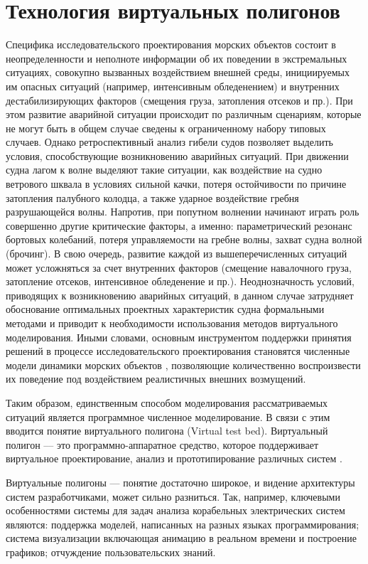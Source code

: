 \section{Технология виртуальных полигонов}
\label{ch1_1_1}

Специфика исследовательского проектирования морских объектов состоит в неопределенности и неполноте информации об их поведении в экстремальных ситуациях, совокупно вызванных воздействием внешней среды, инициируемых им опасных ситуаций (например, интенсивным обледенением) и внутренних дестабилизирующих факторов (смещения груза, затопления отсеков и пр.). При этом развитие аварийной ситуации происходит по различным сценариям, которые не могут быть в общем случае сведены к ограниченному набору типовых случаев. Однако ретроспективный анализ гибели судов позволяет выделить условия, способствующие возникновению аварийных ситуаций. При движении судна лагом к волне выделяют такие ситуации, как воздействие на судно ветрового шквала в условиях сильной качки, потеря остойчивости по причине затопления палубного колодца, а также ударное воздействие гребня разрушающейся волны. Напротив, при попутном волнении начинают играть роль совершенно другие критические факторы, а именно: параметрический резонанс бортовых колебаний, потеря управляемости на гребне волны, захват судна волной (брочинг). В свою очередь, развитие каждой из вышеперечисленных ситуаций может усложняться за счет внутренних факторов (смещение навалочного груза, затопление отсеков, интенсивное обледенение и пр.). Неоднозначность условий, приводящих к возникновению аварийных ситуаций, в данном случае затрудняет обоснование оптимальных проектных характеристик судна формальными методами и приводит к необходимости использования методов виртуального моделирования. Иными словами, основным инструментом поддержки принятия решений в процессе исследовательского проектирования становятся численные модели динамики морских объектов \citep{nechaev_ai}, позволяющие количественно воспроизвести их поведение под воздействием реалистичных внешних возмущений.

Таким образом, единственным способом моделирования рассматриваемых ситуаций является программное численное моделирование. В связи с этим вводится понятие виртуального полигона (Virtual test bed).
Виртуальный полигон --– это программно-аппаратное средство, которое поддерживает виртуальное проектирование, анализ и прототипирование различных систем \citep{vtb_ship_ee} \citep{vtb_ILRO}. 

Виртуальные полигоны --- понятие достаточно широкое, и видение архитектуры систем разработчиками, может сильно разниться. Так, например, ключевыми особенностями системы для задач анализа корабельных электрических систем \citep{vtb_ship_ee} являются: поддержка моделей, написанных на разных языках программирования; система визуализации включающая анимацию в реальном времени и построение графиков; отчуждение пользовательских знаний.

